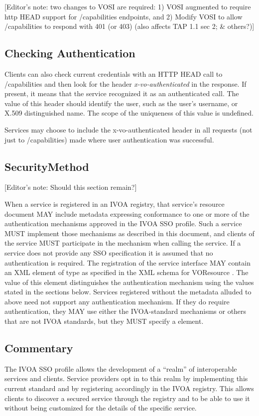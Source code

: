 \documentclass[11pt,a4paper]{ivoa}
\begin{document}
{{{[Editor's note: two changes to VOSI are required: 1) VOSI augmented to
require http HEAD support for /capabilities endpoints, and 2) Modify
VOSI to allow /capabilities to respond with 401 (or 403) (also affects
TAP 1.1 sec 2; & others?)]

\subsection{Checking Authentication}

Clients can also check current credentials with an HTTP HEAD call to
/capabilities and then look for the header \emph{x-vo-authenticated} in
the response. If present, it means that the service recognized it as an
authenticated call.  The value of this header should identify the user,
such as the user's username, or X.509 distinguished name.  The scope of
the uniqueness of this value is undefined.

Services may choose to include the x-vo-authenticated header in all
requests (not just to /capabilities) made where user authentication was
successful.

\subsection{SecurityMethod}

[Editor's note: Should this section remain?]

When a service is registered in an IVOA registry, that service's
resource document MAY include metadata expressing conformance to one or
more of the authentication mechanisms approved in the IVOA SSO profile.
Such a service MUST implement those mechanisms as described in this
document, and clients of the service MUST participate in the mechanism
when calling the service. If a service does not provide any SSO
specification it is assumed that no authentication is required.
The registration of the service interface MAY contain an XML element
of type  as specified in the XML schema for
VOResource \citep{2018ivoa.spec.0625P}. The value of this element
distinguishes the authentication mechanism using the values stated in
the sections below. Services registered without the metadata alluded to
above need not support any authentication mechanism. If they do require
authentication, they MAY use either the IVOA-standard mechanisms or
others that are not IVOA standards, but they MUST specify a
 element.

\subsection{Commentary}
The IVOA SSO profile allows the development of a ``realm'' of
interoperable services and clients.
Service providers opt in to this realm by implementing this current
standard and by registering accordingly in the IVOA registry.
This allows clients to discover a secured service through the registry
and to be able to use it without
being customized for the details of the specific service.

}}}
\end{document}
